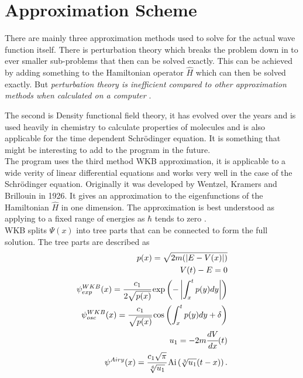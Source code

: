 \documentclass[11pt,DIV=10,final]{scrreprt} %
\begin{document}
{\section{Approximation Scheme}\label{meth:wkb:approximation-scheme}
There are mainly three approximation methods used to solve for the actual wave function itself. There is perturbation theory which breaks the problem down in to ever smaller sub-problems that then can be
solved exactly. This can be achieved by adding something to the Hamiltonian operator $\hat{H}$ which can then be solved exactly. But \textit{perturbation theory is inefficient compared to other approximation
methods when calculated on a computer} \citep[Introduction]{van2014density}.

The second is Density functional field theory, it has evolved over the years and is used heavily in chemistry to calculate properties of molecules and is also applicable for the time dependent Schrödinger
equation. It is something that might be interesting to add to the program in the future.
\\

The program uses the third method WKB approximation, it is applicable to a wide verity of linear differential equations and works very well in the case of the Schrödinger equation.
Originally it was developed by Wentzel, Kramers and Brillouin in 1926. It gives an approximation to the eigenfunctions of the Hamiltonian $\hat{H}$ in one dimension. The approximation is best
understood as applying to a fixed range of energies as $\hbar$ tends to zero \citep[p.~305]{hall2013quantum}.
\\

WKB splits $\Psi(x)$ into tree parts that can be connected to form the full solution. The tree parts are described as
\begin{align}
\label{eq:wkb:momentum}
  p(x) = \sqrt{2m(|E - V(x)|)} \\
\label{eq:wkb:t}
  V(t) - E = 0 \\
\label{eq:wkb:exp}
  \psi^{WKB}_{exp}(x)= \cfrac{c_{1}}{2 \sqrt{p(x)}} \exp\left(-\left|\int_{x}^{t}p(y) dy\right|\right) \\
\label{eq:wkb:osc}
  \psi^{WKB}_{osc} (x)= \cfrac{c_{1}}{\sqrt{p(x)}} \cos\left(\int_{x}^{t}p(y) dy + \delta \right) \\
  u_{1} = -2 m \cfrac{dV}{dx}(t) \\
\label{eq:airy}
  \psi^{Airy}(x) = \cfrac{c_{1} \sqrt{\pi}}{\sqrt[6]{u_{1}}} \operatorname{Ai}\left(\sqrt[3]{u_{1}} (t - x)\right).
\end{align}

}
\end{document}
